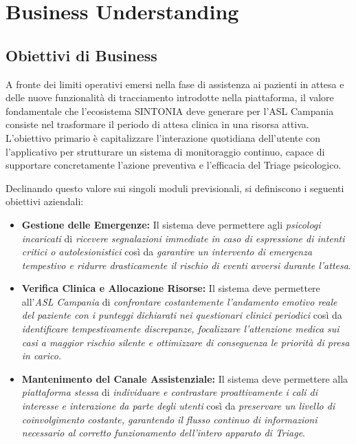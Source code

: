 \chapter{Business Understanding}
\label{ch:business_understanding}

\section{Obiettivi di Business}
\label{sec:obiettivi_business}

A fronte dei limiti operativi emersi nella fase di assistenza ai pazienti in attesa e delle nuove funzionalità di tracciamento introdotte nella piattaforma, il valore fondamentale che l'ecosistema SINTONIA deve generare per l'ASL Campania consiste nel trasformare il periodo di attesa clinica in una risorsa attiva. L'obiettivo primario è capitalizzare l'interazione quotidiana dell'utente con l'applicativo per strutturare un sistema di monitoraggio continuo, capace di supportare concretamente l'azione preventiva e l'efficacia del Triage psicologico.

Declinando questo valore sui singoli moduli previsionali, si definiscono i seguenti obiettivi aziendali:

\begin{itemize}
    \item \textbf{Gestione delle Emergenze:} Il sistema deve permettere agli \emph{psicologi incaricati} di \emph{ricevere segnalazioni immediate in caso di espressione di intenti critici o autolesionistici} così da \emph{garantire un intervento di emergenza tempestivo e ridurre drasticamente il rischio di eventi avversi durante l'attesa}.

    \item \textbf{Verifica Clinica e Allocazione Risorse:} Il sistema deve permettere all'\emph{ASL Campania} di \emph{confrontare costantemente l'andamento emotivo reale del paziente con i punteggi dichiarati nei questionari clinici periodici} così da \emph{identificare tempestivamente discrepanze, focalizzare l'attenzione medica sui casi a maggior rischio silente e ottimizzare di conseguenza le priorità di presa in carico}.

    \item \textbf{Mantenimento del Canale Assistenziale:} Il sistema deve permettere alla \emph{piattaforma stessa} di \emph{individuare e contrastare proattivamente i cali di interesse e interazione da parte degli utenti} così da \emph{preservare un livello di coinvolgimento costante, garantendo il flusso continuo di informazioni necessario al corretto funzionamento dell'intero apparato di Triage}.
\end{itemize}

